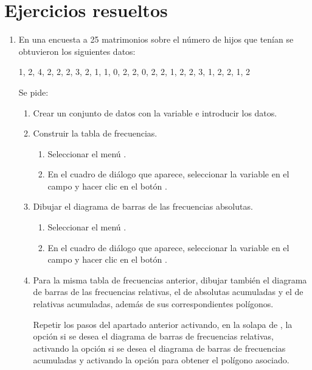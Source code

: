 \section{Ejercicios resueltos}
\begin{enumerate}[leftmargin=*]

\item  En una encuesta a 25 matrimonios sobre el número de hijos que tenían se obtuvieron los siguientes datos:
\begin{center}
1, 2, 4, 2, 2, 2, 3, 2, 1, 1, 0, 2, 2, 0, 2, 2, 1, 2, 2, 3, 1, 2, 2, 1, 2
\end{center}
Se pide:
\begin{enumerate}
\item Crear un conjunto de datos con la variable  e introducir los datos.

\item Construir la tabla de frecuencias.
\begin{indicacion}{
\begin{enumerate}
\item Seleccionar el menú  .
\item En el cuadro de diálogo que aparece, seleccionar la variable  en el campo  y hacer clic en el botón .
\end{enumerate}}
\end{indicacion}

\item  Dibujar el diagrama de barras de las frecuencias absolutas.
\begin{indicacion}{
\begin{enumerate}
\item Seleccionar el menú .
\item En el cuadro de diálogo que aparece, seleccionar la variable  en el campo  y hacer
clic en el botón .
\end{enumerate}}
\end{indicacion}

\item Para la misma tabla de frecuencias anterior, dibujar también el diagrama de barras de las frecuencias relativas,
el de absolutas acumuladas y el de relativas acumuladas, además de sus correspondientes polígonos.
\begin{indicacion}{Repetir los pasos del apartado anterior activando, en la solapa de ,
la opción  si se desea el diagrama de barras de frecuencias relativas, activando la opción
 si se desea el diagrama de barras de frecuencias acumuladas y activando la opción
 para obtener el polígono asociado.}
\end{indicacion}
\end{enumerate}


\end{enumerate}
